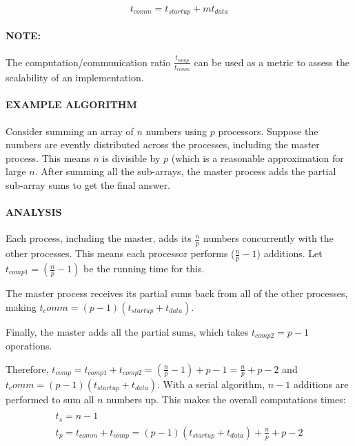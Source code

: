 \documentclass{article}
\begin{document}
\begin{equation}
	t_{comm} = t_{startup} + m t_{data}
	\label{eq:time-comm-formula}
\end{equation}

\paragraph{\textbf{NOTE:}} The computation/communication ratio $\frac{t_{comp}}{t_{comm}}$ can be used as a metric to assess the scalability of an implementation.

\paragraph{\textbf{EXAMPLE ALGORITHM}} Consider summing an array of $n$ numbers using $p$ processors. Suppose the numbers are evently distributed across the processes, including the master process. This means $n$ is divisible by $p$ (which is a reasonable approximation for large $n$. After summing all the sub-arrays, the master process adds the partial sub-array sums to get the final answer.

\paragraph{\textbf{ANALYSIS}} Each process, including the master, adds its $\frac{n}{p}$ numbers concurrently with the other processes. This means each processor performs ($\frac{n}{p} - 1$) additions. Let $t_{comp1} = (\frac{n}{p} - 1)$ be the running time for this.

The master process receives its partial sums back from all of the other processes, making $t_comm = (p - 1)(t_{startup} + t_{data})$. 

Finally, the master adds all the partial sums, which takes $t_{comp2} = p - 1$ operations.

Therefore, $t_{comp} = t_{comp1} + t_{comp2} = (\frac{n}{p} - 1) + p - 1 = \frac{n}{p} + p - 2$ and $t_comm = (p - 1)(t_{startup} + t_{data})$. With a serial algorithm, $n - 1$ additions are performed to sum all $n$ numbers up. This makes the overall computations times:
\begin{multline}\\
	t_s = n - 1 \\
	t_p = t_{comm} + t_{comp} = (p - 1)(t_{startup} + t_{data}) + \frac{n}{p} + p - 2 \\
\end{multline}
\end{document}

